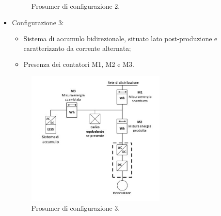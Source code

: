 \begin{itemize}
\begin{figure}[H]
            \caption{Prosumer di configurazione 2.}
            \label{fig:Prosumer_configurazione_2}
        \end{figure}
    \item Configurazione 3:
          \begin{itemize}
              \item Sistema di accumulo bidirezionale, situato lato post-produzione e caratterizzato da corrente alternata;
              \item Presenza dei contatori M1, M2 e M3.
          \end{itemize}
          \begin{figure}[H]
            \centering
            \includegraphics[width=7cm]{images/config03.png}
            \caption{Prosumer di configurazione 3.}
            \label{fig:Prosumer_configurazione_}
        \end{figure}
\end{itemize}

